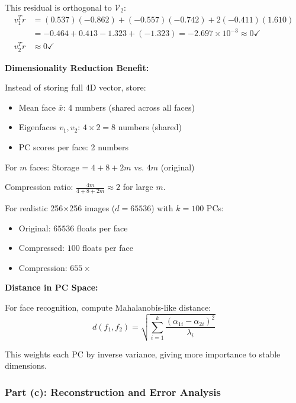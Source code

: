 \documentclass[12pt]{article}
\begin{document}
\begin{explanation}
This residual is orthogonal to $\mathcal{V}_2$:
\begin{align*}
v_1^T r &= (0.537)(-0.862) + (-0.557)(-0.742) + 2(-0.411)(1.610) \\
&= -0.464 + 0.413 - 1.323 + (-1.323) = -2.697 \times 10^{-3} \approx 0 \checkmark \\
v_2^T r &\approx 0 \checkmark
\end{align*}

\textbf{Dimensionality Reduction Benefit:}

Instead of storing full 4D vector, store:
\begin{itemize}
    \item Mean face $\bar{x}$: 4 numbers (shared across all faces)
    \item Eigenfaces $v_1, v_2$: $4 \times 2 = 8$ numbers (shared)
    \item PC scores per face: 2 numbers
\end{itemize}

For $m$ faces: Storage = $4 + 8 + 2m$ vs. $4m$ (original)

Compression ratio: $\frac{4m}{4 + 8 + 2m} \approx 2$ for large $m$.

For realistic 256×256 images ($d = 65536$) with $k = 100$ PCs:
\begin{itemize}
    \item Original: $65536$ floats per face
    \item Compressed: $100$ floats per face
    \item Compression: $655\times$
\end{itemize}

\textbf{Distance in PC Space:}

For face recognition, compute Mahalanobis-like distance:
\[
d(f_1, f_2) = \sqrt{\sum_{i=1}^k \frac{(\alpha_{1i} - \alpha_{2i})^2}{\lambda_i}}
\]

This weights each PC by inverse variance, giving more importance to stable dimensions.

\end{explanation}

\subsubsection{Part (c): Reconstruction and Error Analysis}
\end{document}
